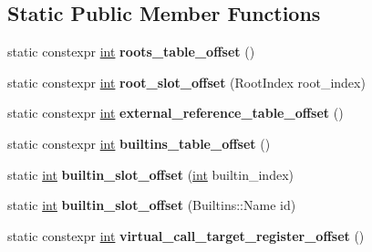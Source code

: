 \subsection*{Static Public Member Functions}
\begin{DoxyCompactItemize}
\item 
\mbox{\label{classv8_1_1internal_1_1IsolateData_a56558a0d7f84218a378553cb7c5371bc}} 
static constexpr \mbox{\hyperlink{classint}{int}} {\bfseries roots\+\_\+table\+\_\+offset} ()
\item 
\mbox{\label{classv8_1_1internal_1_1IsolateData_a8bd280ebaf3c7d370ba882d5b91350e1}} 
static constexpr \mbox{\hyperlink{classint}{int}} {\bfseries root\+\_\+slot\+\_\+offset} (Root\+Index root\+\_\+index)
\item 
\mbox{\label{classv8_1_1internal_1_1IsolateData_a338ed020c98d9c687ae29fd54f4ab994}} 
static constexpr \mbox{\hyperlink{classint}{int}} {\bfseries external\+\_\+reference\+\_\+table\+\_\+offset} ()
\item 
\mbox{\label{classv8_1_1internal_1_1IsolateData_a17a4544fd84500de00b60b319fddcfbb}} 
static constexpr \mbox{\hyperlink{classint}{int}} {\bfseries builtins\+\_\+table\+\_\+offset} ()
\item 
\mbox{\label{classv8_1_1internal_1_1IsolateData_ae31abd8b7628102a9807eefe12ac2b22}} 
static \mbox{\hyperlink{classint}{int}} {\bfseries builtin\+\_\+slot\+\_\+offset} (\mbox{\hyperlink{classint}{int}} builtin\+\_\+index)
\item 
\mbox{\label{classv8_1_1internal_1_1IsolateData_a2337f444e917bee3d0b2530e388c7af8}} 
static \mbox{\hyperlink{classint}{int}} {\bfseries builtin\+\_\+slot\+\_\+offset} (Builtins\+::\+Name id)
\item 
\mbox{\label{classv8_1_1internal_1_1IsolateData_a9da7e2bc64f150d0339a910a8f3e8d4d}} 
static constexpr \mbox{\hyperlink{classint}{int}} {\bfseries virtual\+\_\+call\+\_\+target\+\_\+register\+\_\+offset} ()
\end{DoxyCompactItemize}
